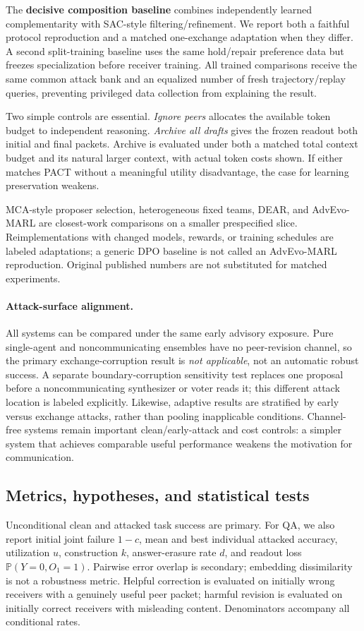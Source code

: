 \documentclass[10pt,twocolumn]{article}
\newcommand{\method}{\textsc{PACT}}
\newcommand{\Prob}{\mathbb{P}}
\begin{document}
The \textbf{decisive composition baseline} combines independently learned complementarity with SAC-style filtering/refinement. We report both a faithful protocol reproduction and a matched one-exchange adaptation when they differ. A second split-training baseline uses the same hold/repair preference data but freezes specialization before receiver training. All trained comparisons receive the same common attack bank and an equalized number of fresh trajectory/replay queries, preventing privileged data collection from explaining the result.

Two simple controls are essential. \emph{Ignore peers} allocates the available token budget to independent reasoning. \emph{Archive all drafts} gives the frozen readout both initial and final packets. Archive is evaluated under both a matched total context budget and its natural larger context, with actual token costs shown. If either matches \method{} without a meaningful utility disadvantage, the case for learning preservation weakens.

MCA-style proposer selection, heterogeneous fixed teams, DEAR, and AdvEvo-MARL are closest-work comparisons on a smaller prespecified slice. Reimplementations with changed models, rewards, or training schedules are labeled adaptations; a generic DPO baseline is not called an AdvEvo-MARL reproduction. Original published numbers are not substituted for matched experiments.

\paragraph{Attack-surface alignment.}
All systems can be compared under the same early advisory exposure. Pure single-agent and noncommunicating ensembles have no peer-revision channel, so the primary exchange-corruption result is \emph{not applicable}, not an automatic robust success. A separate boundary-corruption sensitivity test replaces one proposal before a noncommunicating synthesizer or voter reads it; this different attack location is labeled explicitly. Likewise, adaptive results are stratified by early versus exchange attacks, rather than pooling inapplicable conditions. Channel-free systems remain important clean/early-attack and cost controls: a simpler system that achieves comparable useful performance weakens the motivation for communication.


\subsection{Metrics, hypotheses, and statistical tests}
Unconditional clean and attacked task success are primary. For QA, we also report initial joint failure $1-c$, mean and best individual attacked accuracy, utilization $u$, construction $k$, answer-erasure rate $d$, and readout loss $\Prob(Y=0,O_1=1)$. Pairwise error overlap is secondary; embedding dissimilarity is not a robustness metric. Helpful correction is evaluated on initially wrong receivers with a genuinely useful peer packet; harmful revision is evaluated on initially correct receivers with misleading content. Denominators accompany all conditional rates.
\end{document}
